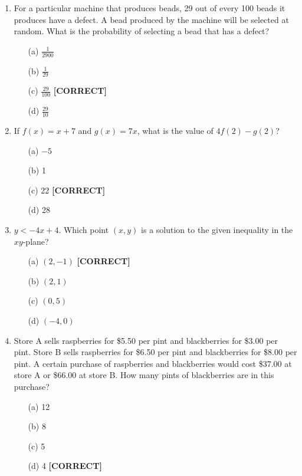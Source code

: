 \documentclass[12pt]{article}
\begin{document}
\begin{enumerate}
\item For a particular machine that produces beads, 29 out of every 100 beads it produces have a defect. A bead produced by the machine will be selected at random. What is the probability of selecting a bead that has a defect?
\begin{enumerate}
    \item[(a)] $\frac{1}{2900}$
    \item[(b)] $\frac{1}{29}$
    \item[(c)] $\frac{29}{100}$ \quad \textbf{[CORRECT]}
    \item[(d)] $\frac{29}{10}$
\end{enumerate}

\item If $f(x) = x + 7$ and $g(x) = 7x$, what is the value of $4f(2) - g(2)$?
\begin{enumerate}
    \item[(a)] $-5$
    \item[(b)] 1
    \item[(c)] 22 \quad \textbf{[CORRECT]}
    \item[(d)] 28
\end{enumerate}

\item $y < -4x + 4$. Which point $(x, y)$ is a solution to the given inequality in the $xy$-plane?
\begin{enumerate}
    \item[(a)] $(2, -1)$ \quad \textbf{[CORRECT]}
    \item[(b)] $(2, 1)$
    \item[(c)] $(0, 5)$
    \item[(d)] $(-4, 0)$
\end{enumerate}

\item Store A sells raspberries for \$5.50 per pint and blackberries for \$3.00 per pint. Store B sells raspberries for \$6.50 per pint and blackberries for \$8.00 per pint. A certain purchase of raspberries and blackberries would cost \$37.00 at store A or \$66.00 at store B. How many pints of blackberries are in this purchase?
\begin{enumerate}
    \item[(a)] 12
    \item[(b)] 8
    \item[(c)] 5
    \item[(d)] 4 \quad \textbf{[CORRECT]}
\end{enumerate}


\end{enumerate}
\end{document}
